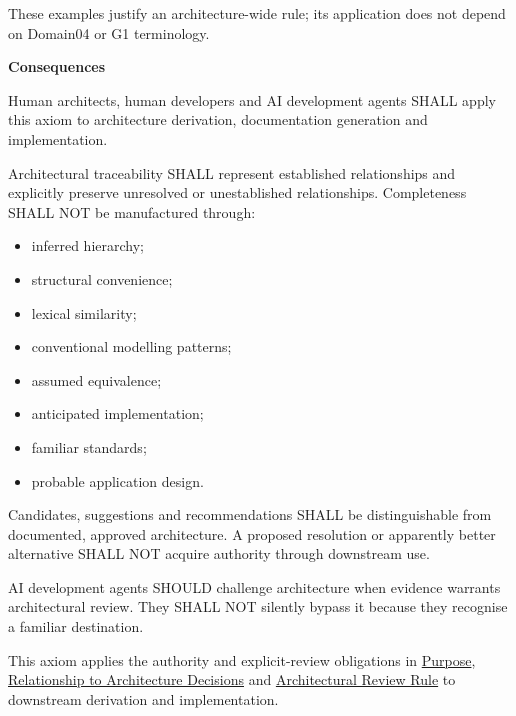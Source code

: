 These examples justify an architecture-wide rule; its application does
not depend on Domain04 or G1 terminology.



\par\medskip\textbf{Consequences}\par


Human architects, human developers and AI development agents SHALL apply
this axiom to architecture derivation, documentation generation and
implementation.



Architectural traceability SHALL represent established relationships and
explicitly preserve unresolved or unestablished relationships.
Completeness SHALL NOT be manufactured through:



\begin{itemize}


\item inferred hierarchy;

\item structural convenience;

\item lexical similarity;

\item conventional modelling patterns;

\item assumed equivalence;

\item anticipated implementation;

\item familiar standards;

\item probable application design.

\end{itemize}


Candidates, suggestions and recommendations SHALL be distinguishable from
documented, approved architecture. A proposed resolution or apparently
better alternative SHALL NOT acquire authority through downstream use.



AI development agents SHOULD challenge architecture when evidence
warrants architectural review. They SHALL NOT silently bypass it because
they recognise a familiar destination.



This axiom applies the authority and explicit-review obligations in
\href{\detokenize{../../../../../../../../governance/architectural-axioms.md#1-purpose}}{Purpose}, \href{\detokenize{../../../../../../../../governance/architectural-axioms.md#6-relationship-to-architecture-decisions}}{Relationship to Architecture Decisions}
and \href{\detokenize{../../../../../../../../governance/architectural-axioms.md#7-architectural-review-rule}}{Architectural Review Rule} to downstream
derivation and implementation.



